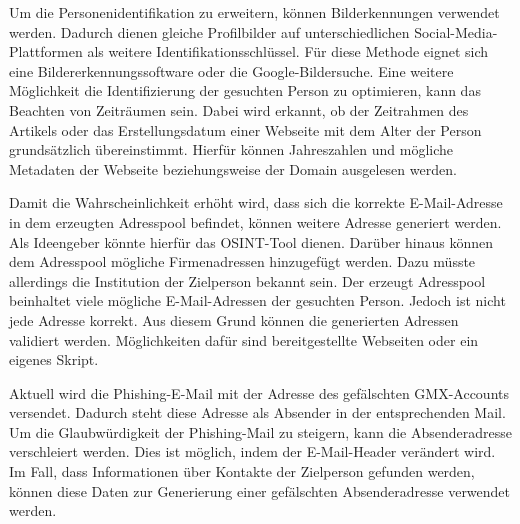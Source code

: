 Um die Personenidentifikation zu erweitern, können Bilderkennungen verwendet werden. Dadurch dienen gleiche Profilbilder auf unterschiedlichen Social-Media-Plattformen als weitere Identifikationsschlüssel. Für diese Methode eignet sich eine Bildererkennungssoftware oder die Google-Bildersuche. Eine weitere Möglichkeit die Identifizierung der gesuchten Person zu optimieren, kann das Beachten von Zeiträumen sein. Dabei wird erkannt, ob der Zeitrahmen des Artikels oder das Erstellungsdatum einer Webseite mit dem Alter der Person grundsätzlich übereinstimmt. Hierfür können Jahreszahlen und mögliche Metadaten der Webseite beziehungsweise der Domain ausgelesen werden.

Damit die Wahrscheinlichkeit erhöht wird, dass sich die korrekte E-Mail-Adresse in dem erzeugten Adresspool befindet, können weitere Adresse generiert werden. Als Ideengeber könnte hierfür das OSINT-Tool \cite{EmailAssumptions} dienen. Darüber hinaus können dem Adresspool mögliche Firmenadressen hinzugefügt werden. Dazu müsste allerdings die Institution der Zielperson bekannt sein. Der erzeugt Adresspool beinhaltet viele mögliche E-Mail-Adressen der gesuchten Person. Jedoch ist nicht jede Adresse korrekt. Aus diesem Grund können die generierten Adressen validiert werden. Möglichkeiten dafür sind bereitgestellte Webseiten oder ein eigenes Skript.

Aktuell wird die Phishing-E-Mail mit der Adresse des gefälschten GMX-Accounts versendet. Dadurch steht diese Adresse als Absender in der entsprechenden Mail. Um die Glaubwürdigkeit der Phishing-Mail zu steigern, kann die Absenderadresse verschleiert werden. Dies ist möglich, indem der E-Mail-Header verändert wird. Im Fall, dass Informationen über Kontakte der Zielperson gefunden werden, können diese Daten zur Generierung einer gefälschten Absenderadresse verwendet werden.


